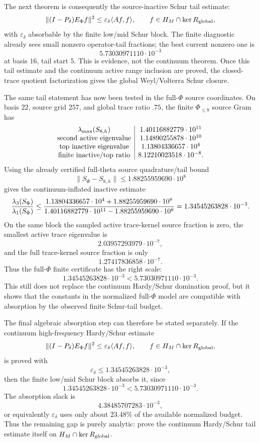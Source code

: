 \documentclass[11pt]{article}
\begin{document}
The next theorem is consequently the source-inactive Schur tail estimate:
\[
  \|(I-P_\delta)E_\Phi f\|^2
  \le \varepsilon_\delta \langle Af,f\rangle,
  \qquad f\in H_M\cap\ker R_{\rm global},
\]
with \(\varepsilon_\delta\) absorbable by the finite low/mid Schur block.
The finite diagnostic already sees small nonzero operator-tail fractions; the
best current nonzero one is
\[
  5.73030971110\cdot10^{-3}
\]
at basis \(16\), tail start \(5\).  This is evidence, not the continuum
theorem.  Once this tail estimate and the continuum active range inclusion are
proved, the closed-trace quotient factorization gives the global
Weyl/Volterra Schur closure.

The same tail statement has now been tested in the full-\(\Phi\) source
coordinates.  On basis \(22\), source grid \(257\), and global trace ratio
\(.75\), the finite \(\Phi_{\le8}\) source Gram has
\[
\begin{array}{c|c}
\lambda_{\max}(S_{8,h})&1.40116882779\cdot10^{11}\\
\hbox{second active eigenvalue}&1.14890255878\cdot10^{10}\\
\hbox{top inactive eigenvalue}&1.13804336657\cdot10^4\\
\hbox{finite inactive/top ratio}&8.12210023518\cdot10^{-8}.
\end{array}
\]
Using the already certified full-theta source quadrature/tail bound
\[
  \|S_\Phi-S_{8,h}\|\le1.88255959690\cdot10^8
\]
gives the continuum-inflated inactive estimate
\[
  {\lambda_3(S_\Phi)\over\lambda_1(S_\Phi)}
  \le
  {1.13804336657\cdot10^4+1.88255959690\cdot10^8
   \over
   1.40116882779\cdot10^{11}-1.88255959690\cdot10^8}
  =1.34545263828\cdot10^{-3}.
\]
On the same block the sampled active trace-kernel source fraction is zero,
the smallest active trace eigenvalue is
\[
  2.03957293979\cdot10^{-7},
\]
and the full trace-kernel source fraction is only
\[
  1.27417836858\cdot10^{-7}.
\]
Thus the full-\(\Phi\) finite certificate has the right scale:
\[
  1.34545263828\cdot10^{-3}
  <
  5.73030971110\cdot10^{-3}.
\]
This still does not replace the continuum Hardy/Schur domination proof, but it
shows that the constants in the normalized full-\(\Phi\) model are compatible
with absorption by the observed finite Schur-tail budget.

The final algebraic absorption step can therefore be stated separately.  If
the continuum high-frequency Hardy/Schur estimate
\[
  \|(I-P_\delta)E_\Phi f\|^2
  \le \varepsilon_\delta \langle Af,f\rangle,
  \qquad f\in H_M\cap\ker R_{\rm global},
\]
is proved with
\[
  \varepsilon_\delta\le 1.34545263828\cdot10^{-3},
\]
then the finite low/mid Schur block absorbs it, since
\[
  1.34545263828\cdot10^{-3}
  <
  5.73030971110\cdot10^{-3}.
\]
The absorption slack is
\[
  4.38485707283\cdot10^{-3},
\]
or equivalently \(\varepsilon_\delta\) uses only about \(23.48\%\) of the
available normalized budget.  Thus the remaining gap is purely analytic:
prove the continuum Hardy/Schur tail estimate itself on
\(H_M\cap\ker R_{\rm global}\).
\end{document}
